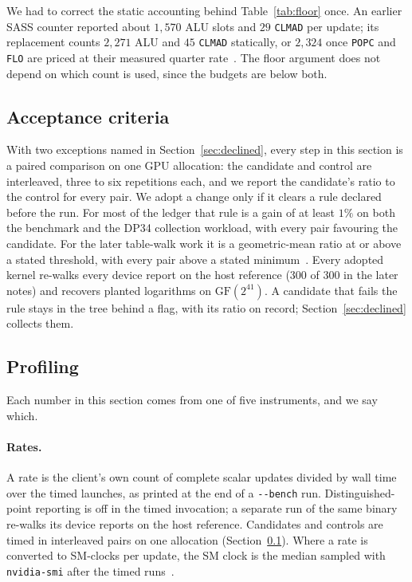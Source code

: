 We had to correct the static accounting behind Table~\ref{tab:floor}
once. An earlier SASS counter reported about $1{,}570$ ALU slots and
$29$ \texttt{CLMAD} per update; its replacement counts $2{,}271$ ALU and
$45$ \texttt{CLMAD} statically, or $2{,}324$ once \texttt{POPC} and
\texttt{FLO} are priced at their measured quarter
rate~. The floor argument does
not depend on which count is used, since the budgets are below both.

\subsection{Acceptance criteria}
\label{sec:gates}

With two exceptions named in Section~\ref{sec:declined}, every step
in this section is a paired comparison on one GPU allocation: the
candidate and control are interleaved, three to six repetitions each,
and we report the candidate's ratio to the control for every pair. We
adopt a change only if it clears a rule declared before the run. For
most of the ledger that rule is a gain of at least $1\%$ on both the
benchmark and the DP34 collection workload, with every pair favouring
the candidate. For the later table-walk work it is a geometric-mean
ratio at or above a stated threshold, with every pair above a stated
minimum~.
Every adopted kernel re-walks every device report on the host
reference ($300$ of $300$ in the later notes) and recovers planted
logarithms on $\mathrm{GF}(2^{41})$. A candidate that fails the rule
stays in the tree behind a flag, with its ratio on record;
Section~\ref{sec:declined} collects them.

\subsection{Profiling}
\label{sec:profiling}

Each number in this section comes from one of five instruments, and
we say which.

\paragraph{Rates.} A rate is the client's own count of complete scalar
updates divided by wall time over the timed launches, as printed at
the end of a \texttt{-{}-bench} run. Distinguished-point reporting is off
in the timed invocation; a separate run of the same binary re-walks its
device reports on the host reference. Candidates and controls are
timed in interleaved pairs on one allocation (Section~\ref{sec:gates}).
Where a rate is converted to SM-clocks per update, the SM clock is the
median sampled with \texttt{nvidia-smi} after the timed
runs~.


